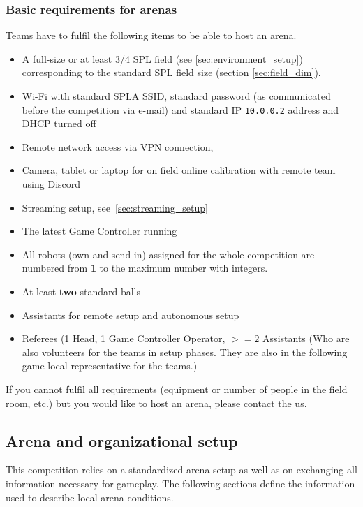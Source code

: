 \subsubsection{Basic requirements for arenas}
\label{sec:c3_BasicRequirementsForArenas}
Teams have to fulfil the following items to be able to host an arena.

\begin{itemize}
    \item A full-size or at least 3/4 SPL field (see \ref{sec:environment_setup}) corresponding to the standard SPL field size (\cf section \ref{sec:field_dim}).
	\item Wi-Fi with standard SPL\textunderscore A SSID, standard password (as communicated before the competition via e-mail) and standard IP \texttt{10.0.0.2} address and DHCP turned off
    \item Remote network access via VPN connection,
    \item Camera, tablet or laptop for on field online calibration with remote team using Discord
    \item Streaming setup, see~\ref{sec:streaming_setup}
	\item The latest Game Controller running
    \item All robots (own and send in) assigned for the whole competition are numbered from \textbf{1} to the maximum number with integers.
    \item At least \textbf{two} standard balls
    \item Assistants for remote setup and autonomous setup
    \item Referees (1 Head, 1 Game Controller Operator, $>= 2$ Assistants (Who are also volunteers for the teams in setup phases. They are also in the following game local representative for the teams.)
\end{itemize}

If you cannot fulfil all requirements (equipment or number of people in the field room, etc.) but you would like to host an arena, please contact the us.

\subsection{Arena and organizational setup}
\label{sec:arean-org-setup}
This competition relies on a standardized arena setup as well as on exchanging all information necessary for gameplay. The following sections define the information used to describe local arena conditions.

